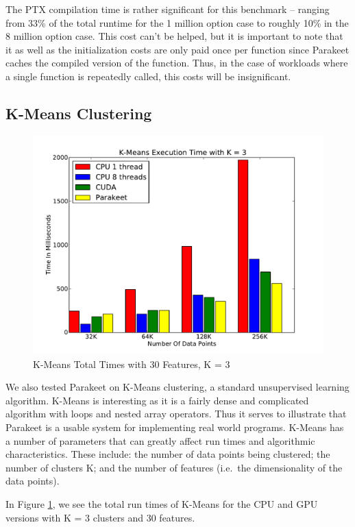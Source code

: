 \documentclass[preprint]{sigplanconf}
\begin{document}
The PTX compilation time is rather significant for this benchmark -- ranging from 33\% of the total runtime for the 1 million option case to roughly 10\% in the 8 million option case.  This cost can't be helped, but it is important to note that it as well as the initialization costs are only paid once per function since Parakeet caches the compiled version of the function.  Thus, in the case of workloads where a single function is repeatedly called, this costs will be insignificant.

\subsection{K-Means Clustering}
\label{results-k-means}

\begin{figure}
\includegraphics[scale=0.45]{KMCPUK3.pdf}
\caption{K-Means Total Times with 30 Features, K = 3}
\label{KMCPU3}
\end{figure}

We also tested Parakeet on K-Means clustering, a standard unsupervised learning algorithm.  K-Means is interesting as it is a fairly dense and complicated algorithm with loops and nested array operators.  Thus it serves to illustrate that Parakeet is a usable system for implementing real world programs.  K-Means has a number of parameters that can greatly affect run times and algorithmic characteristics.  These include: the number of data points being clustered; the number of clusters K; and the number of features (i.e.~the dimensionality of the data points).

In Figure \ref{KMCPU3}, we see the total run times of K-Means for the CPU and GPU versions with K = 3 clusters and 30 features.
\end{document}
